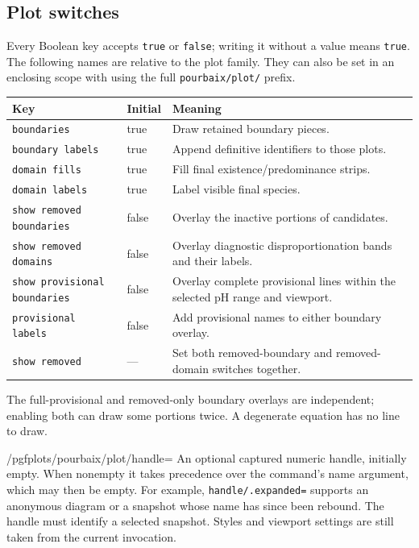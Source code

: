 \documentclass[a4paper,11pt]{ltxdoc}
\begin{document}
\subsection{Plot switches}
Every Boolean key accepts \texttt{true} or \texttt{false}; writing it without a
value means \texttt{true}. The following names are relative to the plot family.
They can also be set in an enclosing scope with  using the full
\texttt{pourbaix/plot/} prefix.
\begin{center}
\begin{tabular}{>{\raggedright\arraybackslash}p{5cm}p{1.3cm}>{\raggedright\arraybackslash}p{7.5cm}}
Key & Initial & Meaning\\\hline
\texttt{boundaries} & true & Draw retained boundary pieces.\\
\texttt{boundary labels} & true & Append definitive identifiers to those plots.\\
\texttt{domain fills} & true & Fill final existence/predominance strips.\\
\texttt{domain labels} & true & Label visible final species.\\
\texttt{show removed boundaries} & false & Overlay the inactive portions of candidates.\\
\texttt{show removed domains} & false & Overlay diagnostic disproportionation bands and their labels.\\
\texttt{show provisional boundaries} & false & Overlay complete provisional lines within the selected pH range and viewport.\\
\texttt{provisional labels} & false & Add provisional names to either boundary overlay.\\
\texttt{show removed} & --- & Set both removed-boundary and removed-domain switches together.
\end{tabular}
\end{center}
The full-provisional and removed-only boundary overlays are independent; enabling
both can draw some portions twice. A degenerate equation has no line to draw.

\begin{key}{/pgfplots/pourbaix/plot/handle=}
An optional captured numeric handle, initially empty. When nonempty it takes
precedence over the command's name argument, which may then be empty. For example,
\texttt{handle/.expanded=\string\saved} supports an anonymous diagram or a
snapshot whose name has since been rebound. The handle must identify a selected
snapshot. Styles and viewport settings are still taken from the current invocation.
\end{key}
\end{document}
